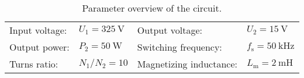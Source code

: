 
\begin{table}[htb]
    \centering  %
    \begin{tabular}{llll}
        \toprule
        Input voltage: &  $U_{\mathrm{1}} = \SI{325}{\volt}$ & Output voltage: & $U_{\mathrm{2}} = \SI{15}{\volt}$ \\ 
        Output power: & $P_{\mathrm{2}} = \SI{50}{\watt}$ & Switching frequency: & $f_{\mathrm{s}} = \SI{50}{\kilo\hertz}$ \\
        Turns ratio: &  $N_{\mathrm{1}}/N_{\mathrm{2}}=10$ & Magnetizing inductance: & $L_{\mathrm{m}}=\SI{2}{\milli\henry}$  \\
        \bottomrule
    \end{tabular}
    \caption{Parameter overview of the circuit.}
    \label{table:Ex04_Forward converter with asymmetric half-bridge}
\end{table}